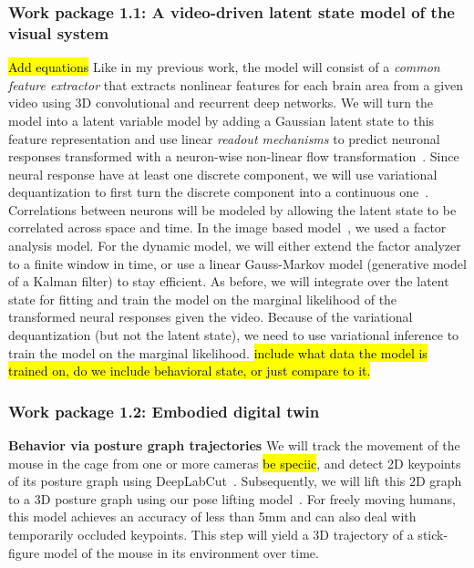 \documentclass[B2,COG]{ercgrant}
\begin{document}
\subsubsection{Work package 1.1: A video-driven latent state model of the visual system\hfill{}}
\hl{Add equations}
Like in my previous work, the model will consist of a \textit{common feature extractor} that extracts nonlinear features for each brain area from a given video using 3D convolutional and recurrent deep networks.
We will turn the model into a latent variable model by adding a Gaussian latent state to this feature representation and use linear \textit{readout mechanisms} to predict neuronal responses transformed with a neuron-wise non-linear flow transformation~\parencite{Bashiri2021-or, Rezende2015-mx}.
Since neural response have at least one discrete component, we will use variational dequantization to first turn the discrete component into a continuous one~\parencite{Hoogeboom2021-zs}.
Correlations between neurons will be modeled by allowing the latent state to be correlated across space and time. 
In the image based model~\parencite{Bashiri2021-or}, we used a factor analysis model. 
For the dynamic model, we will either extend the factor analyzer to a finite window in time, or use a linear Gauss-Markov model (generative model of a Kalman filter) to stay efficient. 
As before, we will integrate over the latent state for fitting and train the model on the marginal likelihood of the transformed neural responses given the video.
Because of the variational dequantization (but not the latent state), we need to use variational inference to train the model on the marginal likelihood. 
\hl{include what data the model is trained on, do we include behavioral state, or just compare to it.}

\subsubsection{Work package 1.2: Embodied digital twin\hfill{}}

\textbf{Behavior via posture graph trajectories}
We will track the movement of the mouse in the cage from one or more cameras \hl{be speciic}, and detect 2D keypoints of its posture graph using DeepLabCut~\parencite{Mathis2018-lk}. 
Subsequently, we will lift this 2D graph to a 3D posture graph using our pose lifting model~\parencite{Pierzchlewicz2022-tq}. 
For freely moving humans, this model achieves an accuracy of less than 5mm and can also deal with temporarily occluded keypoints. 
This step will yield a 3D trajectory of a stick-figure model of the mouse in its environment over time. 
\end{document}
